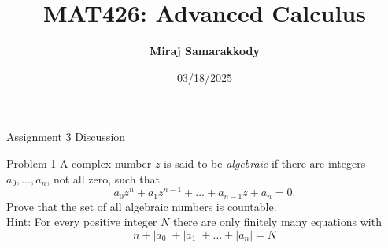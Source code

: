 \documentclass{beamer}
\title{MAT426: Advanced Calculus}
\author{\textbf{Miraj Samarakkody}}
\institute{Tougaloo College}
\date{03/18/2025}
\begin{document}
\begin{frame}
    \titlepage
\end{frame}

\begin{frame}{Assignment 3 Discussion}
    \begin{block}{Problem 1}
       A complex number \(z\) is said to be \textit{algebraic} if there are integers \(a_0, \dots, a_n\), not all zero, such that \[a_0z^n+a_1z^{n-1}+\dots+a_{n-1}z+a_n=0.\] Prove that  the set of all algebraic numbers is countable. \\

       Hint: For every positive integer \(N\) there are only finitely many equations with \[n+|a_0|+|a_1|+\dots+|a_n|=N\]
    \end{block}
    
\end{frame}
\end{document}
